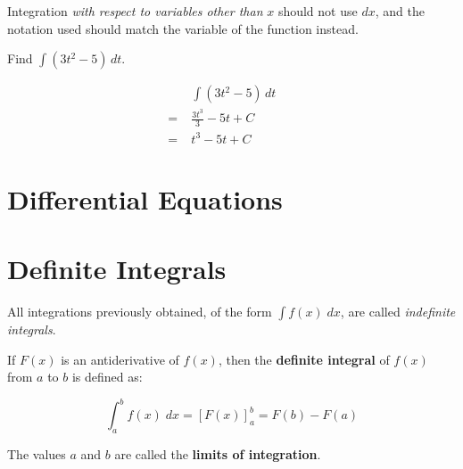 \documentclass[
  11pt,
  openany]{book}
\begin{document}
Integration \textit{with respect to variables other than} \(x\) should not use \(dx\), and the notation used should match the variable of the function instead.

\begin{tcolorbox}[title=Example 11.1.4,colback=RoyalBlue!2, colframe=RoyalBlue]

Find $\displaystyle{\int \left(3t^2-5\right)}\,dt$.

\tcblower

\vspace{-0.3cm}

\begin{align*}
    &\int \left(3t^2-5\right)\,dt&&\\[0.5em]
    =\;&\frac{3t^3}{3}-5t+C&&\\[0.5em]
    =\;&t^3-5t+C&&
\end{align*}

\end{tcolorbox}

\pagebreak

\section{Differential Equations}\label{differential-equations}

\pagebreak

\section{Definite Integrals}\label{definite-integrals}

\vspace{-0.5cm}

All integrations previously obtained, of the form \(\displaystyle{\int f(x)\;dx}\), are called \emph{indefinite integrals}.

\begin{center}
\begin{tcolorbox}[colback=red!5,width=16.5cm,colframe=red!70!black]

If $F(x)$ is an antiderivative of $f(x)$, then the \textbf{definite integral} of $f(x)$ from $a$ to $b$ is defined as:

\[\displaystyle{\int_a^b f(x)\;dx=\left[F(x)\right]_a^b=F(b)-F(a)}\]

\vspace{0.1cm}

The values $a$ and $b$ are called the \textbf{limits of integration}.

\end{tcolorbox}
\end{center}
\end{document}
